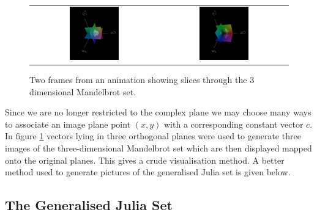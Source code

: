 \begin{figure}
\centering
\begin{tabular}{c@{$\quad$}c}
\includegraphics[width=0.4\textwidth]{3dmandel1}
 & \includegraphics[width=0.4\textwidth]{3dmandel2} 
\end{tabular}
\caption{\label{fig:3dmandel}
  Two frames from an animation\cite{FRAC:MandelAnim} showing slices through
          the 3 dimensional Mandelbrot set.}
\end{figure}

Since we are no longer restricted to the complex plane we may choose many ways
to associate an image plane point $(x,y)$ with a corresponding constant
vector $c$. In figure \ref{fig:3dmandel} vectors lying in three orthogonal
planes were used to generate three images of the three-dimensional
Mandelbrot set which are then displayed mapped onto the original planes. This
gives a crude visualisation method. A better method used to generate pictures
of the generalised Julia set is given below.

\subsection{The Generalised Julia Set}

